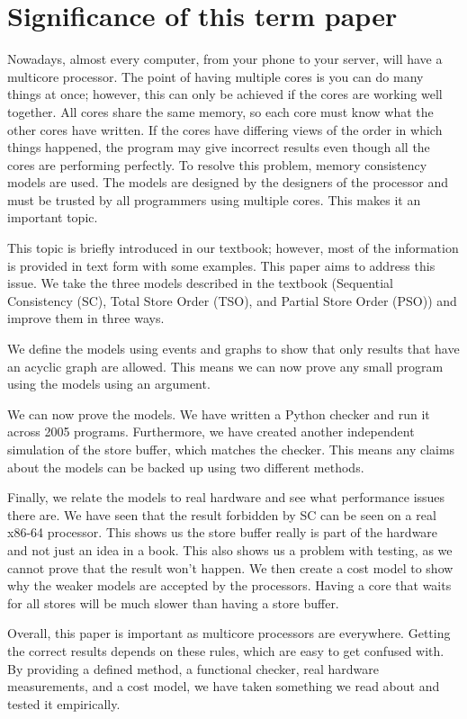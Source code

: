\section{Significance of this term paper}
\label{sec:topic}

Nowadays, almost every computer, from your phone to your server, will have a multicore processor. The point of having multiple cores is you can do many things at once; however, this can only be achieved if the cores are working well together. All cores share the same memory, so each core must know what the other cores have written. If the cores have differing views of the order in which things happened, the program may give incorrect results even though all the cores are performing perfectly. To resolve this problem, memory consistency models are used. The models are designed by the designers of the processor and must be trusted by all programmers using multiple cores. This makes it an important topic.

This topic is briefly introduced in our textbook; however, most of the information is provided in text form with some examples. This paper aims to address this issue. We take the three models described in the textbook (Sequential Consistency (SC), Total Store Order (TSO), and Partial Store Order (PSO)) and improve them in three ways.

We define the models using events and graphs to show that only results that have an acyclic graph are allowed. This means we can now prove any small program using the models using an argument.

We can now prove the models. We have written a Python checker and run it across 2005 programs. Furthermore, we have created another independent simulation of the store buffer, which matches the checker. This means any claims about the models can be backed up using two different methods.

Finally, we relate the models to real hardware and see what performance issues there are. We have seen that the result forbidden by SC can be seen on a real x86-64 processor. This shows us the store buffer really is part of the hardware and not just an idea in a book. This also shows us a problem with testing, as we cannot prove that the result won't happen. We then create a cost model to show why the weaker models are accepted by the processors. Having a core that waits for all stores will be much slower than having a store buffer.

Overall, this paper is important as multicore processors are everywhere. Getting the correct results depends on these rules, which are easy to get confused with. By providing a defined method, a functional checker, real hardware measurements, and a cost model, we have taken something we read about and tested it empirically.

